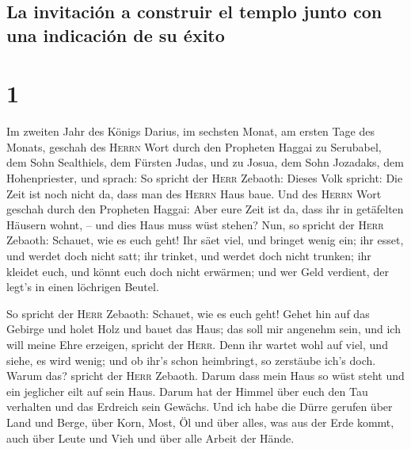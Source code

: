 \hypertarget{la-invitaciuxf3n-a-construir-el-templo-junto-con-una-indicaciuxf3n-de-su-uxe9xito}{%
\subsection{La invitación a construir el templo junto con una indicación
de su
éxito}\label{la-invitaciuxf3n-a-construir-el-templo-junto-con-una-indicaciuxf3n-de-su-uxe9xito}}

\hypertarget{section}{%
\section{1}\label{section}}

 Im zweiten Jahr des Königs Darius, im sechsten Monat, am
ersten Tage des Monats, geschah des \textsc{Herrn} Wort durch den
Propheten Haggai zu Serubabel, dem Sohn Sealthiels, dem Fürsten Judas,
und zu Josua, dem Sohn Jozadaks, dem Hohenpriester, und sprach:
 So spricht der \textsc{Herr} Zebaoth: Dieses Volk
spricht: Die Zeit ist noch nicht da, dass man des \textsc{Herrn} Haus
baue.  Und des \textsc{Herrn} Wort geschah durch den
Propheten Haggai:  Aber eure Zeit ist da, dass ihr in
getäfelten Häusern wohnt, -- und dies Haus muss wüst stehen?
 Nun, so spricht der \textsc{Herr} Zebaoth: Schauet, wie
es euch geht!  Ihr säet viel, und bringet wenig ein; ihr
esset, und werdet doch nicht satt; ihr trinket, und werdet doch nicht
trunken; ihr kleidet euch, und könnt euch doch nicht erwärmen; und wer
Geld verdient, der legt's in einen löchrigen Beutel.

 So spricht der \textsc{Herr} Zebaoth: Schauet, wie es
euch geht!  Gehet hin auf das Gebirge und holet Holz und
bauet das Haus; das soll mir angenehm sein, und ich will meine Ehre
erzeigen, spricht der \textsc{Herr}.  Denn ihr wartet wohl
auf viel, und siehe, es wird wenig; und ob ihr's schon heimbringt, so
zerstäube ich's doch. Warum das? spricht der \textsc{Herr} Zebaoth.
Darum dass mein Haus so wüst steht und ein jeglicher eilt auf sein Haus.
 Darum hat der Himmel über euch den Tau verhalten und das
Erdreich sein Gewächs.  Und ich habe die Dürre gerufen
über Land und Berge, über Korn, Most, Öl und über alles, was aus der
Erde kommt, auch über Leute und Vieh und über alle Arbeit der Hände.

